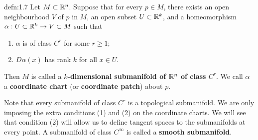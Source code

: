 \begin{defn}{defn:1.7}
    Let $M \subset \mathbb{R}^n$. Suppose that for every $p \in M$, there exists 
    an open neighbourhood $V$ of $p$ in $M$, an open subset $U \subset \mathbb{R}^k$, 
    and a homeomorphism $\alpha : U \subset \mathbb{R}^k \to V \subset M$ such that 
    \begin{enumerate}[(1)]
        \item $\alpha$ is of class $C^r$ for some $r \geq 1$; 
        \item $D\alpha(x)$ has rank $k$ for all $x \in U$. 
    \end{enumerate}
    Then $M$ is called a {\bf $k$-dimensional submanifold of $\mathbb{R}^n$ of 
    class $C^r$}. We call $\alpha$ a {\bf coordinate chart} (or 
    {\bf coordinate patch}) about $p$.
\end{defn}\vspace{-0.25cm}

Note that every submanifold of class $C^r$ is a topological submanifold. 
We are only imposing the extra conditions (1) and (2) on the coordinate charts. 
We will see that condition (2) will allow us to define tangent spaces to 
the submanifolds at every point. A submanifold of class $C^\infty$ is 
called a {\bf smooth submanifold}. 

